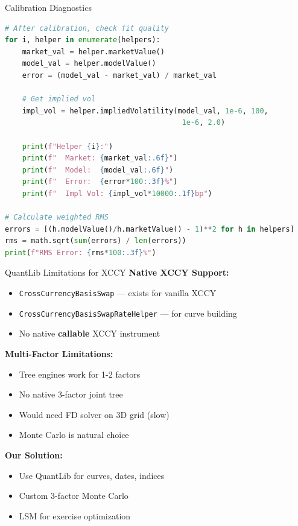 \documentclass[aspectratio=169,11pt]{beamer}
\begin{document}
\begin{frame}[fragile]{Calibration Diagnostics}
\begin{lstlisting}[language=Python]
# After calibration, check fit quality
for i, helper in enumerate(helpers):
    market_val = helper.marketValue()
    model_val = helper.modelValue()
    error = (model_val - market_val) / market_val

    # Get implied vol
    impl_vol = helper.impliedVolatility(model_val, 1e-6, 100,
                                         1e-6, 2.0)

    print(f"Helper {i}:")
    print(f"  Market: {market_val:.6f}")
    print(f"  Model:  {model_val:.6f}")
    print(f"  Error:  {error*100:.3f}%")
    print(f"  Impl Vol: {impl_vol*10000:.1f}bp")

# Calculate weighted RMS
errors = [(h.modelValue()/h.marketValue() - 1)**2 for h in helpers]
rms = math.sqrt(sum(errors) / len(errors))
print(f"RMS Error: {rms*100:.3f}%")
\end{lstlisting}
\end{frame}

\begin{frame}{QuantLib Limitations for XCCY}
\textbf{Native XCCY Support:}
\begin{itemize}
    \item \texttt{CrossCurrencyBasisSwap} --- exists for vanilla XCCY
    \item \texttt{CrossCurrencyBasisSwapRateHelper} --- for curve building
    \item No native \textbf{callable} XCCY instrument
\end{itemize}

\textbf{Multi-Factor Limitations:}
\begin{itemize}
    \item Tree engines work for 1-2 factors
    \item No native 3-factor joint tree
    \item Would need FD solver on 3D grid (slow)
    \item Monte Carlo is natural choice
\end{itemize}

\textbf{Our Solution:}
\begin{itemize}
    \item Use QuantLib for curves, dates, indices
    \item Custom 3-factor Monte Carlo
    \item LSM for exercise optimization
\end{itemize}
\end{frame}
\end{document}
